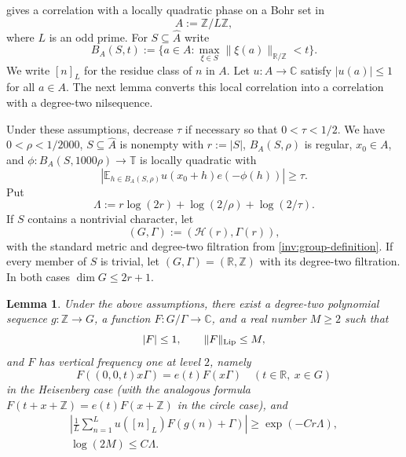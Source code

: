 \documentclass[twoside]{aomart}
\theoremstyle{paperplain}
\newtheorem{lemma}[theorem]{Lemma}
\theoremstyle{paperdefinition}
\numberwithin{equation}{section}
\begin{document}
 gives a correlation with a locally
quadratic phase on a Bohr set in
\[
 A:=\mathbb Z/L\mathbb Z,
\]
where $L$ is an odd prime. For $S\subseteq\widehat A$ write
\[
 B_A(S,t):=\{a\in A:\max_{\xi\in S}\|\xi(a)\|_{\mathbb R/\mathbb Z}<t\}.
\]
We write $[n]_L$ for the residue class of $n$ in $A$.
Let $u:A\to\mathbb C$ satisfy $|u(a)|\le1$ for all $a\in A$.
The next lemma converts this local correlation into a correlation with
a degree-two nilsequence.

Under these assumptions, decrease $\tau$ if necessary so that
$0<\tau<1/2$. We have $0<\rho<1/2000$, $S\subseteq\widehat A$ is
nonempty with $r:=|S|$, $B_A(S,\rho)$ is regular, $x_0\in A$, and
$\phi:B_A(S,1000\rho)\to\mathbb T$ is locally quadratic with
\[
 \left|\mathbb E_{h\in B_A(S,\rho)}
 u(x_0+h)e(-\phi(h))\right|\ge\tau.
\]
Put
\begin{equation*}
 \Lambda:=r\log(2r)+\log(2/\rho)+\log(2/\tau).
\end{equation*}
If $S$ contains a nontrivial character, let
\[
 (G,\Gamma):=(\mathcal H(r),\Gamma(r)),
\]
with the standard metric and degree-two filtration from
\eqref{inv:group-definition}. If every member of $S$ is trivial, let
$(G,\Gamma)=(\mathbb R,\mathbb Z)$ with its degree-two filtration.
In both cases $\dim G\le2r+1$.

\begin{lemma}
\label{inv:realization}
Under the above assumptions, there exist a degree-two polynomial sequence $g:\mathbb Z\to G$,
a function $F:G/\Gamma\to\mathbb C$, and a real number $M\ge2$ such that
\[
 |F|\le1,\qquad \|F\|_{\rm Lip}\le M,
\]
and $F$ has vertical frequency one at level $2$, namely
\[
 F((0,0,t)x\Gamma)=e(t)F(x\Gamma)
 \quad(t\in\mathbb R,\ x\in G)
\]
in the Heisenberg case (with the analogous formula
$F(t+x+\mathbb Z)=e(t)F(x+\mathbb Z)$ in the circle case), and
\begin{gather}
 \left|\frac1L\sum_{n=1}^L
 u([n]_L)F(g(n)+\Gamma)\right|
 \ge\exp(-Cr\Lambda),
 \label{inv:eq:realization-correlation}\\
 \log(2M)\le C\Lambda.
 \label{inv:eq:realization-complexity}
\end{gather}
\end{lemma}
\end{document}
